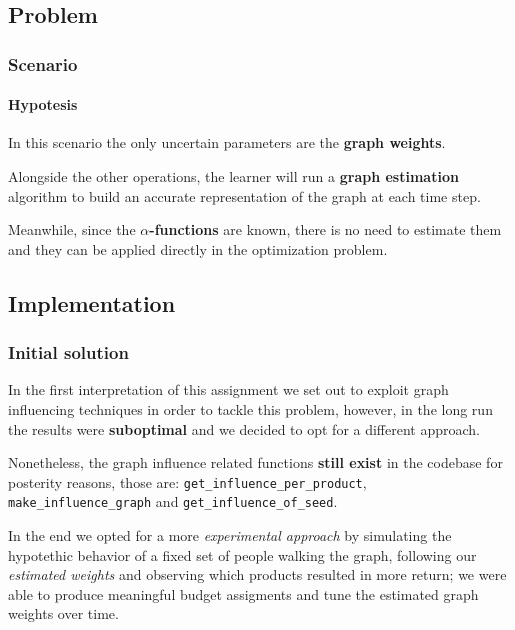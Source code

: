 
\subsection{Problem}


\begin{frame}

\frametitle{Scenario}
\framesubtitle{Hypotesis}

In this scenario the only uncertain parameters are the \textbf{graph weights}.

Alongside the other operations, the learner will run a \textbf{graph estimation} algorithm to build an accurate representation of the graph at each time step.

Meanwhile, since the \textbf{$\alpha$-functions} are known, there is no need to estimate them and they can be applied directly in the optimization problem.

\end{frame}


\subsection{Implementation}


\begin{frame}

\frametitle{Initial solution}

In the first interpretation of this assignment we set out to exploit graph influencing techniques in order to tackle this problem, however, in the long run the results were \textbf{suboptimal} and we decided to opt for a different approach.

Nonetheless, the graph influence related functions \textbf{still exist} in the codebase for posterity reasons, those are: \texttt{get\_influence\_per\_product}, \texttt{make\_influence\_graph} and \texttt{get\_influence\_of\_seed}.

In the end we opted for a more \textit{experimental approach} by simulating the hypotethic behavior of a fixed set of people walking the graph, following our \textit{estimated weights} and observing which products resulted in more return; we were able to produce meaningful budget assigments and tune the estimated graph weights over time.

\end{frame}

